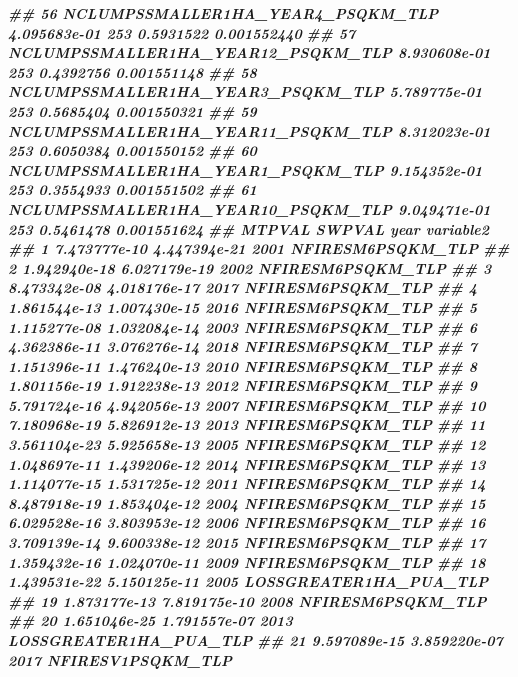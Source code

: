 \documentclass[10pt,landscape,a3paper]{article}
\newenvironment{Shaded}{\begin{snugshade}}{\end{snugshade}}
\newcommand{\DocumentationTok}[1]{\textcolor[rgb]{0.56,0.35,0.01}{\textbf{\textit{#1}}}}
\begin{document}
\begin{Shaded}
\begin{Highlighting}[]
\DocumentationTok{\#\# 56  NCLUMPSSMALLER1HA\_YEAR4\_PSQKM\_TLP 4.095683e{-}01    253 0.5931522 0.001552440}
\DocumentationTok{\#\# 57 NCLUMPSSMALLER1HA\_YEAR12\_PSQKM\_TLP 8.930608e{-}01    253 0.4392756 0.001551148}
\DocumentationTok{\#\# 58  NCLUMPSSMALLER1HA\_YEAR3\_PSQKM\_TLP 5.789775e{-}01    253 0.5685404 0.001550321}
\DocumentationTok{\#\# 59 NCLUMPSSMALLER1HA\_YEAR11\_PSQKM\_TLP 8.312023e{-}01    253 0.6050384 0.001550152}
\DocumentationTok{\#\# 60  NCLUMPSSMALLER1HA\_YEAR1\_PSQKM\_TLP 9.154352e{-}01    253 0.3554933 0.001551502}
\DocumentationTok{\#\# 61 NCLUMPSSMALLER1HA\_YEAR10\_PSQKM\_TLP 9.049471e{-}01    253 0.5461478 0.001551624}
\DocumentationTok{\#\#          MTPVAL       SWPVAL year                  variable2}
\DocumentationTok{\#\# 1  7.473777e{-}10 4.447394e{-}21 2001          NFIRESM6PSQKM\_TLP}
\DocumentationTok{\#\# 2  1.942940e{-}18 6.027179e{-}19 2002          NFIRESM6PSQKM\_TLP}
\DocumentationTok{\#\# 3  8.473342e{-}08 4.018176e{-}17 2017          NFIRESM6PSQKM\_TLP}
\DocumentationTok{\#\# 4  1.861544e{-}13 1.007430e{-}15 2016          NFIRESM6PSQKM\_TLP}
\DocumentationTok{\#\# 5  1.115277e{-}08 1.032084e{-}14 2003          NFIRESM6PSQKM\_TLP}
\DocumentationTok{\#\# 6  4.362386e{-}11 3.076276e{-}14 2018          NFIRESM6PSQKM\_TLP}
\DocumentationTok{\#\# 7  1.151396e{-}11 1.476240e{-}13 2010          NFIRESM6PSQKM\_TLP}
\DocumentationTok{\#\# 8  1.801156e{-}19 1.912238e{-}13 2012          NFIRESM6PSQKM\_TLP}
\DocumentationTok{\#\# 9  5.791724e{-}16 4.942056e{-}13 2007          NFIRESM6PSQKM\_TLP}
\DocumentationTok{\#\# 10 7.180968e{-}19 5.826912e{-}13 2013          NFIRESM6PSQKM\_TLP}
\DocumentationTok{\#\# 11 3.561104e{-}23 5.925658e{-}13 2005          NFIRESM6PSQKM\_TLP}
\DocumentationTok{\#\# 12 1.048697e{-}11 1.439206e{-}12 2014          NFIRESM6PSQKM\_TLP}
\DocumentationTok{\#\# 13 1.114077e{-}15 1.531725e{-}12 2011          NFIRESM6PSQKM\_TLP}
\DocumentationTok{\#\# 14 8.487918e{-}19 1.853404e{-}12 2004          NFIRESM6PSQKM\_TLP}
\DocumentationTok{\#\# 15 6.029528e{-}16 3.803953e{-}12 2006          NFIRESM6PSQKM\_TLP}
\DocumentationTok{\#\# 16 3.709139e{-}14 9.600338e{-}12 2015          NFIRESM6PSQKM\_TLP}
\DocumentationTok{\#\# 17 1.359432e{-}16 1.024070e{-}11 2009          NFIRESM6PSQKM\_TLP}
\DocumentationTok{\#\# 18 1.439531e{-}22 5.150125e{-}11 2005     LOSSGREATER1HA\_PUA\_TLP}
\DocumentationTok{\#\# 19 1.873177e{-}13 7.819175e{-}10 2008          NFIRESM6PSQKM\_TLP}
\DocumentationTok{\#\# 20 1.651046e{-}25 1.791557e{-}07 2013     LOSSGREATER1HA\_PUA\_TLP}
\DocumentationTok{\#\# 21 9.597089e{-}15 3.859220e{-}07 2017          NFIRESV1PSQKM\_TLP}

\end{Highlighting}
\end{Shaded}
\end{document}
